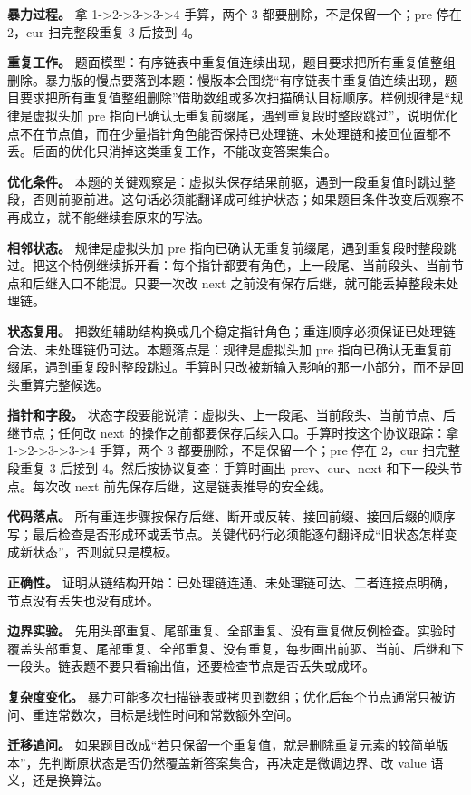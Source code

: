 \textbf{暴力过程。} 拿 1->2->3->3->4 手算，两个 3 都要删除，不是保留一个；pre 停在 2，cur 扫完整段重复 3 后接到 4。

\textbf{重复工作。} 题面模型：有序链表中重复值连续出现，题目要求把所有重复值整组删除。暴力版的慢点要落到本题：慢版本会围绕“有序链表中重复值连续出现，题目要求把所有重复值整组删除”借助数组或多次扫描确认目标顺序。样例规律是“规律是虚拟头加 pre 指向已确认无重复前缀尾，遇到重复段时整段跳过”，说明优化点不在节点值，而在少量指针角色能否保持已处理链、未处理链和接回位置都不丢。后面的优化只消掉这类重复工作，不能改变答案集合。

\textbf{优化条件。} 本题的关键观察是：虚拟头保存结果前驱，遇到一段重复值时跳过整段，否则前驱前进。这句话必须能翻译成可维护状态；如果题目条件改变后观察不再成立，就不能继续套原来的写法。

\textbf{相邻状态。} 规律是虚拟头加 pre 指向已确认无重复前缀尾，遇到重复段时整段跳过。把这个特例继续拆开看：每个指针都要有角色，上一段尾、当前段头、当前节点和后继入口不能混。只要一次改 next 之前没有保存后继，就可能丢掉整段未处理链。

\textbf{状态复用。} 把数组辅助结构换成几个稳定指针角色；重连顺序必须保证已处理链合法、未处理链仍可达。本题落点是：规律是虚拟头加 pre 指向已确认无重复前缀尾，遇到重复段时整段跳过。手算时只改被新输入影响的那一小部分，而不是回头重算完整候选。

\textbf{指针和字段。} 状态字段要能说清：虚拟头、上一段尾、当前段头、当前节点、后继节点；任何改 next 的操作之前都要保存后续入口。手算时按这个协议跟踪：拿 1->2->3->3->4 手算，两个 3 都要删除，不是保留一个；pre 停在 2，cur 扫完整段重复 3 后接到 4。然后按协议复查：手算时画出 prev、cur、next 和下一段头节点。每次改 next 前先保存后继，这是链表推导的安全线。

\textbf{代码落点。} 所有重连步骤按保存后继、断开或反转、接回前缀、接回后缀的顺序写；最后检查是否形成环或丢节点。关键代码行必须能逐句翻译成“旧状态怎样变成新状态”，否则就只是模板。

\textbf{正确性。} 证明从链结构开始：已处理链连通、未处理链可达、二者连接点明确，节点没有丢失也没有成环。

\textbf{边界实验。} 先用头部重复、尾部重复、全部重复、没有重复做反例检查。实验时覆盖头部重复、尾部重复、全部重复、没有重复，每步画出前驱、当前、后继和下一段头。链表题不要只看输出值，还要检查节点是否丢失或成环。

\textbf{复杂度变化。} 暴力可能多次扫描链表或拷贝到数组；优化后每个节点通常只被访问、重连常数次，目标是线性时间和常数额外空间。

\textbf{迁移追问。} 如果题目改成“若只保留一个重复值，就是删除重复元素的较简单版本”，先判断原状态是否仍然覆盖新答案集合，再决定是微调边界、改 value 语义，还是换算法。

